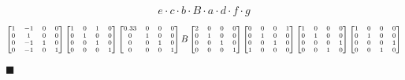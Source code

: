 \documentclass[12pt,a4paper]{article}
\newcommand{\qed}{\hfill $\blacksquare$}
\begin{document}
\begin{align*}
e \cdot c \cdot b \cdot B \cdot a \cdot d \cdot f \cdot g
\end{align*}
\begin{align*}
\begin{scriptsize}
\begin{bmatrix} %
1 & -1 & 0 & 0 \\ 
  0 & 1 & 0 & 0 \\ 
  0 & -1 & 1 & 0 \\ 
  0 & -1 & 0 & 1 
\end{bmatrix}
\begin{bmatrix} %
1 & 0 & 1 & 0 \\ 
0 & 1 & 0 & 0 \\ 
0 & 0 & 1 & 0 \\ 
0 & 0 & 0 & 1
\end{bmatrix}
\begin{bmatrix} %
0.33 & 0 & 0 & 0 \\ 
0 & 1 & 0 & 0 \\ 
0 & 0 & 1 & 0 \\
0 & 0 & 0 & 1 
\end{bmatrix}
B
\begin{bmatrix} %
2 & 0 & 0 & 0 \\ 
0 & 1 & 0 & 0 \\ 
0 & 0 & 1 & 0 \\ 
0 & 0 & 0 & 1
\end{bmatrix}
\begin{bmatrix} %
0 & 0 & 0 & 1 \\ 
0 & 1 & 0 & 0 \\ 
0 & 0 & 1 & 0 \\ 
1 & 0 & 0 & 0
\end{bmatrix}
\begin{bmatrix} %
1 & 0 & 0 & 0 \\ 
  0 & 1 & 0 & 0 \\ 
  0 & 0 & 0 & 1 \\ 
  0 & 0 & 1 & 0 
\end{bmatrix}
\begin{bmatrix} %
1 & 0 & 0 & 0 \\ 
0 & 1 & 0 & 0 \\ 
0 & 0 & 0 & 1 \\ 
0 & 0 & 1 & 0 
\end{bmatrix}
\end{scriptsize}
\end{align*}
\qed
\\
\end{document}
